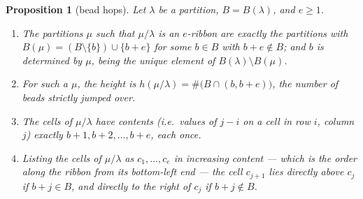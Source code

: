 \documentclass[11pt]{article}
\newtheorem{proposition}[theorem]{Proposition}
\theoremstyle{definition}
\begin{document}
\begin{proposition}[bead hops]\label{prop:hop}
Let $\lambda$ be a partition, $B=B(\lambda)$, and $e\ge1$.
\begin{enumerate}
\item[(i)] The partitions $\mu$ such that $\mu/\lambda$ is an $e$-ribbon are exactly the
partitions with $B(\mu)=(B\setminus\{b\})\cup\{b+e\}$ for some $b\in B$ with $b+e\notin B$; and
$b$ is determined by $\mu$, being the unique element of $B(\lambda)\setminus B(\mu)$.
\item[(ii)] For such a $\mu$, the height is $h(\mu/\lambda)=\#\bigl(B\cap(b,b+e)\bigr)$, the
number of beads strictly jumped over.
\item[(iii)] The cells of $\mu/\lambda$ have contents (i.e.\ values of $j-i$ on a cell in row $i$,
column $j$) exactly $b+1,b+2,\dots,b+e$, each once.
\item[(iv)] Listing the cells of $\mu/\lambda$ as $c_1,\dots,c_e$ in increasing content --- which
is the order along the ribbon from its bottom-left end --- the cell $c_{j+1}$ lies directly above
$c_j$ if $b+j\in B$, and directly to the right of $c_j$ if $b+j\notin B$.
\end{enumerate}
\end{proposition}
\end{document}
